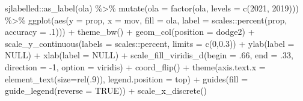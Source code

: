 \documentclass[
  12pt,
]{book}
\newenvironment{Shaded}{\begin{snugshade}}{\end{snugshade}}
\newcommand{\AttributeTok}[1]{\textcolor[rgb]{0.77,0.63,0.00}{#1}}
\newcommand{\ConstantTok}[1]{\textcolor[rgb]{0.00,0.00,0.00}{#1}}
\newcommand{\DecValTok}[1]{\textcolor[rgb]{0.00,0.00,0.81}{#1}}
\newcommand{\FloatTok}[1]{\textcolor[rgb]{0.00,0.00,0.81}{#1}}
\newcommand{\FunctionTok}[1]{\textcolor[rgb]{0.00,0.00,0.00}{#1}}
\newcommand{\NormalTok}[1]{#1}
\newcommand{\SpecialCharTok}[1]{\textcolor[rgb]{0.00,0.00,0.00}{#1}}
\newcommand{\StringTok}[1]{\textcolor[rgb]{0.31,0.60,0.02}{#1}}
\begin{document}
\begin{Shaded}
\begin{Highlighting}[]
\NormalTok{  sjlabelled}\SpecialCharTok{::}\FunctionTok{as\_label}\NormalTok{(ola) }\SpecialCharTok{\%\textgreater{}\%}
  \FunctionTok{mutate}\NormalTok{(}\AttributeTok{ola =} \FunctionTok{factor}\NormalTok{(ola, }\AttributeTok{levels =} \FunctionTok{c}\NormalTok{(}\StringTok{\textquotesingle{}2021\textquotesingle{}}\NormalTok{, }\StringTok{\textquotesingle{}2019\textquotesingle{}}\NormalTok{))) }\SpecialCharTok{\%\textgreater{}\%} 
  \FunctionTok{ggplot}\NormalTok{(}\FunctionTok{aes}\NormalTok{(}\AttributeTok{y =}\NormalTok{ prop, }\AttributeTok{x =}\NormalTok{ mov, }\AttributeTok{fill =}\NormalTok{ ola, }
             \AttributeTok{label =}\NormalTok{ scales}\SpecialCharTok{::}\FunctionTok{percent}\NormalTok{(prop, }\AttributeTok{accuracy =}\NormalTok{ .}\DecValTok{1}\NormalTok{))) }\SpecialCharTok{+}
  \FunctionTok{theme\_bw}\NormalTok{() }\SpecialCharTok{+} 
  \FunctionTok{geom\_col}\NormalTok{(}\AttributeTok{position =} \StringTok{\textquotesingle{}dodge2\textquotesingle{}}\NormalTok{) }\SpecialCharTok{+}
  \FunctionTok{scale\_y\_continuous}\NormalTok{(}\AttributeTok{labels =}\NormalTok{ scales}\SpecialCharTok{::}\NormalTok{percent,}
                     \AttributeTok{limits =} \FunctionTok{c}\NormalTok{(}\DecValTok{0}\NormalTok{,}\FloatTok{0.3}\NormalTok{)) }\SpecialCharTok{+}
  \FunctionTok{ylab}\NormalTok{(}\AttributeTok{label =} \ConstantTok{NULL}\NormalTok{) }\SpecialCharTok{+}
  \FunctionTok{xlab}\NormalTok{(}\AttributeTok{label =} \ConstantTok{NULL}\NormalTok{) }\SpecialCharTok{+}
  \FunctionTok{scale\_fill\_viridis\_d}\NormalTok{(}\AttributeTok{begin =}\NormalTok{ .}\DecValTok{66}\NormalTok{, }\AttributeTok{end =}\NormalTok{ .}\DecValTok{33}\NormalTok{, }\AttributeTok{direction =} \SpecialCharTok{{-}}\DecValTok{1}\NormalTok{, }\AttributeTok{option =} \StringTok{\textquotesingle{}viridis\textquotesingle{}}\NormalTok{) }\SpecialCharTok{+}
  \FunctionTok{coord\_flip}\NormalTok{() }\SpecialCharTok{+}
  \FunctionTok{theme}\NormalTok{(}\AttributeTok{axis.text.x =} \FunctionTok{element\_text}\NormalTok{(}\AttributeTok{size=}\FunctionTok{rel}\NormalTok{(.}\DecValTok{9}\NormalTok{)),}
        \AttributeTok{legend.position =} \StringTok{\textquotesingle{}top\textquotesingle{}}\NormalTok{) }\SpecialCharTok{+}
  \FunctionTok{guides}\NormalTok{(}\AttributeTok{fill =} \FunctionTok{guide\_legend}\NormalTok{(}\AttributeTok{reverse =} \ConstantTok{TRUE}\NormalTok{)) }\SpecialCharTok{+}
  \FunctionTok{scale\_x\_discrete}\NormalTok{()}
\end{Highlighting}
\end{Shaded}
\end{document}
